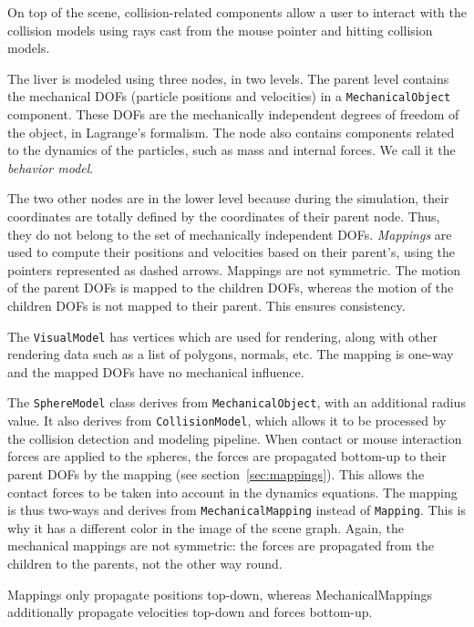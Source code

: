 On top of the scene, collision-related components allow a user to interact with the collision models using rays cast from the mouse pointer and hitting collision models. 

The liver is modeled using three nodes, in two levels. 
The parent level contains the mechanical DOFs (particle positions and velocities) in a \texttt{MechanicalObject} component. 
These DOFs are the mechanically independent degrees of freedom of the object, in Lagrange's formalism. 
The node also contains components related to the dynamics of the particles, such as mass and internal forces. 
We call it the \textit{behavior model}.

The two other nodes are in the lower level because during the simulation, their coordinates are totally defined by the coordinates of their parent node. 
Thus, they do not belong to the set of mechanically independent DOFs. 
\emph{Mappings} are used to compute their positions and velocities based on their parent's, using the pointers represented as dashed arrows. 
Mappings are not symmetric. 
The motion of the parent DOFs is mapped to the children DOFs, whereas the motion of the children DOFs is not mapped to their parent. 
This ensures consistency.

The \texttt{VisualModel} has vertices which are used for rendering, along with other rendering data such as a list of polygons, normals, etc. 
The mapping is one-way and the mapped DOFs have no mechanical influence.

The \texttt{SphereModel} class derives from \texttt{MechanicalObject}, with an additional radius value. 
It also derives from \texttt{CollisionModel}, which allows it to be processed by the collision detection and modeling pipeline. 
When contact or mouse interaction forces are applied to the spheres, the forces are propagated bottom-up to their parent DOFs by the mapping (see section~\ref{sec:mappings}). 
This allows the contact forces to be taken into account in the dynamics equations. 
The mapping is thus two-ways and derives from \texttt{MechanicalMapping} instead of \texttt{Mapping}. 
This is why it has a different color in the image of the scene graph.
Again, the mechanical mappings are not symmetric: the forces are propagated from the children to the parents, not the other way round.

Mappings only propagate positions top-down, whereas MechanicalMappings additionally propagate velocities top-down and forces bottom-up.

